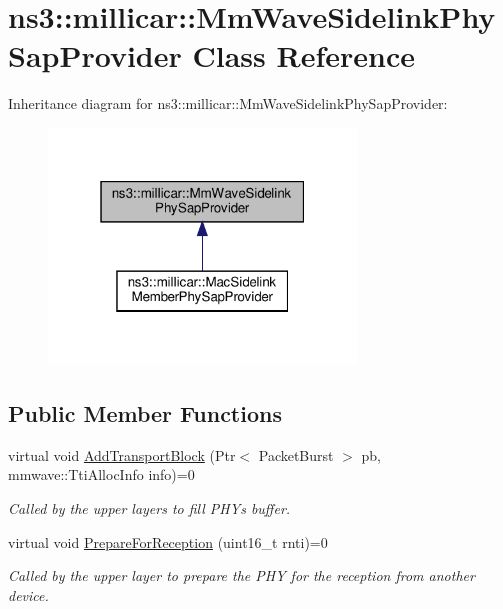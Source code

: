 \hypertarget{classns3_1_1millicar_1_1MmWaveSidelinkPhySapProvider}{}\section{ns3\+:\+:millicar\+:\+:Mm\+Wave\+Sidelink\+Phy\+Sap\+Provider Class Reference}
\label{classns3_1_1millicar_1_1MmWaveSidelinkPhySapProvider}


Inheritance diagram for ns3\+:\+:millicar\+:\+:Mm\+Wave\+Sidelink\+Phy\+Sap\+Provider\+:\nopagebreak
\begin{figure}[H]
\begin{center}
\leavevmode
\includegraphics[width=232pt]{classns3_1_1millicar_1_1MmWaveSidelinkPhySapProvider__inherit__graph}
\end{center}
\end{figure}
\subsection*{Public Member Functions}
\begin{DoxyCompactItemize}
\item 
virtual void \hyperlink{classns3_1_1millicar_1_1MmWaveSidelinkPhySapProvider_acba80cb123b9eb0fcacefde35a91909d}{Add\+Transport\+Block} (Ptr$<$ Packet\+Burst $>$ pb, mmwave\+::\+Tti\+Alloc\+Info info)=0
\begin{DoxyCompactList}\small\item\em Called by the upper layers to fill P\+HY\textquotesingle{}s buffer. \end{DoxyCompactList}\item 
virtual void \hyperlink{classns3_1_1millicar_1_1MmWaveSidelinkPhySapProvider_a1c791fea7b4457a39428f3da49eaf6b8}{Prepare\+For\+Reception} (uint16\+\_\+t rnti)=0
\begin{DoxyCompactList}\small\item\em Called by the upper layer to prepare the P\+HY for the reception from another device. \end{DoxyCompactList}\end{DoxyCompactItemize}


